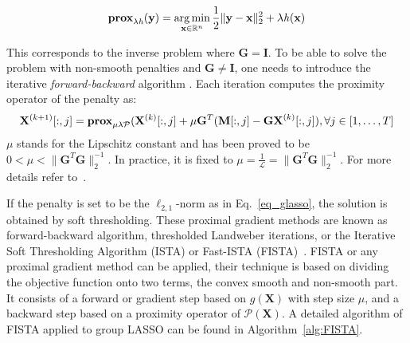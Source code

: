 \begin{equation}
\textbf{prox}_{\lambda\mathit{h}}(\mathbf{y})=\mathop{\mathrm{arg}\,\mathrm{min}}_{\mathbf{x}\in\mathbb{R}^n}\frac{1}{2}\|\mathbf{y}-\mathbf{x}\|_2^2+\lambda\mathit{h}(\mathbf{x})
\end{equation}

This corresponds to the inverse problem where $\mathbf{G}=\mathbf{I}$. To be able to solve the problem with non-smooth penalties and $\mathbf{G}\neq\mathbf{I}$, one needs to introduce the iterative \textit{forward-backward} algorithm \cite{moreau1965proximite}. Each iteration computes the proximity operator of the penalty as:
\begin{equation}
\mathbf{X}^{(k+1)}[:,j]=\textbf{prox}_{\mu\lambda\mathcal{P}}(\mathbf{X}^{(k)}[:,j]+\mu\mathbf{G}^T(\mathbf{M}[:,j]-\mathbf{GX}^{(k)}[:,j]), \forall j\in [1,\dots ,T]
\end{equation}
$\mu$ stands for the Lipschitz constant and has been proved to be $0<\mu<\|\mathbf{G}^T\mathbf{G}\|_2^{-1}$. In practice, it is fixed to $\mu=\frac{1}{\mathcal{L}}=
 \|\mathbf{G}^T\mathbf{G}\|_2^{-1}$. For more details refer to~\cite{moreau1965proximite,combettes2005signal,daubechies2004iterative}.

If the penalty is set to be the $\ell_{2,1}$-norm as in Eq.~\ref{eq_glasso}, the solution is obtained by soft thresholding. These proximal gradient methods are known as forward-backward algorithm, thresholded Landweber iterations, or the Iterative Soft Thresholding Algorithm (ISTA) or Fast-ISTA (FISTA)~\cite{bach-etal:2012,parikh2014proximal}. FISTA or any proximal gradient method can be applied, their technique is based on dividing the objective function onto two terms, the convex smooth and non-smooth part. It consists of a forward or gradient step based on $g(\mathbf{X})$ with step size $\mu$, and a backward step based on a proximity operator of $\mathcal{P}(\mathbf{X})$. A detailed algorithm of FISTA applied to group LASSO can be found in Algorithm~\ref{alg:FISTA}. 


